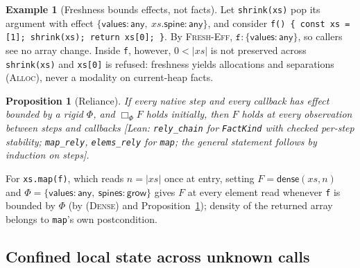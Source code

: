 \documentclass[10pt,a4paper]{article}
\newtheorem{proposition}[theorem]{Proposition}
\theoremstyle{definition}
\newtheorem{example}[theorem]{Example}
\theoremstyle{remark}
\newcommand{\bx}[1]{\Box_{#1}}
\newcommand{\kw}[1]{\mathsf{#1}}
\newcommand{\grow}{\kw{grow}}
\newcommand{\any}{\kw{any}}
\newcommand{\val}{\kw{values}}
\newcommand{\st}{\kw{spines}}
\newcommand{\dense}{\kw{dense}}
\newcommand{\len}[1]{|#1|}
\newcommand{\code}[1]{\texttt{#1}}
\newcommand{\lean}[1]{\texttt{\small #1}}
\newcommand{\status}[1]{\textsf{\small[#1]}}
\begin{document}
\begin{example}[Freshness bounds effects, not facts]\label{ex:fresh}
Let \code{shrink(xs)} pop its argument with effect
$\{\val:\any,\ \mathit{xs}.\kw{spine}:\any\}$, and consider
\code{f() \{ const xs = [1]; shrink(xs); return xs[0]; \}}. By
\textsc{Fresh-Eff}, $\code{f}:\{\val:\any\}$, so callers see no array
change. Inside \code{f}, however, $0<\len{\mathit{xs}}$ is not preserved
across \code{shrink(xs)} and \code{xs[0]} is refused: freshness yields
allocations and separations (\textsc{Alloc}), never a modality on
current-heap facts.
\end{example}

\begin{proposition}[Reliance]\label{prop:rely}
If every native step and every callback has effect bounded by a rigid
$\Phi$, and $\bx{\Phi}F$ holds initially, then $F$ holds at every
observation between steps and callbacks
\status{Lean: \lean{rely\_chain} for \lean{FactKind} with checked per-step stability; \lean{map\_rely}, \lean{elems\_rely} for \code{map}; the general statement follows by induction on steps}.
\end{proposition}

\noindent
For \code{xs.map(f)}, which reads $n=\len{\mathit{xs}}$ once at entry,
setting $F=\dense(\mathit{xs},n)$ and $\Phi=\{\val:\any,\ \st:\grow\}$
gives $F$ at every element read whenever \code{f} is bounded by $\Phi$
(by \textsc{(Dense)} and Proposition~\ref{prop:rely}); density of the
returned array belongs to \code{map}'s own postcondition.

\subsection{Confined local state across unknown calls}
\end{document}
